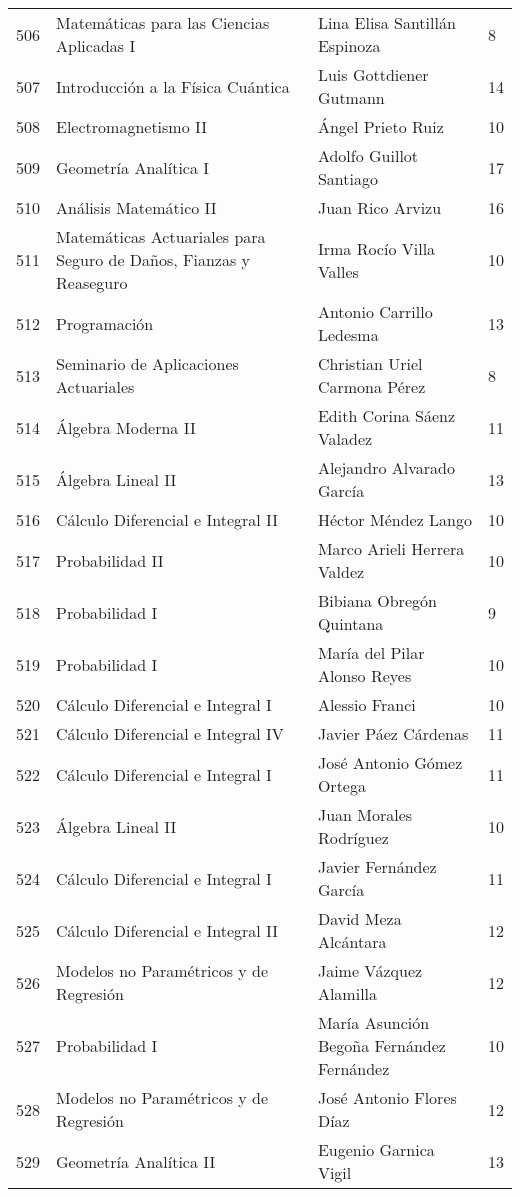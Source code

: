 \begin{table}[ht]
\begin{tabular}{rlll}
  506 & Matemáticas para las Ciencias Aplicadas I & Lina Elisa Santillán Espinoza & 8 \\ 
  507 & Introducción a la Física Cuántica & Luis Gottdiener Gutmann & 14 \\ 
  508 & Electromagnetismo II & Ángel Prieto Ruiz & 10 \\ 
  509 & Geometría Analítica I & Adolfo Guillot Santiago & 17 \\ 
  510 & Análisis Matemático II & Juan Rico Arvizu & 16 \\ 
  511 & Matemáticas Actuariales para Seguro de Daños, Fianzas y Reaseguro & Irma Rocío Villa Valles & 10 \\ 
  512 & Programación & Antonio Carrillo Ledesma & 13 \\ 
  513 & Seminario de Aplicaciones Actuariales & Christian Uriel Carmona Pérez & 8 \\ 
  514 & Álgebra Moderna II & Edith Corina Sáenz Valadez & 11 \\ 
  515 & Álgebra Lineal II & Alejandro Alvarado García & 13 \\ 
  516 & Cálculo Diferencial e Integral II & Héctor Méndez Lango & 10 \\ 
  517 & Probabilidad II & Marco Arieli Herrera Valdez & 10 \\ 
  518 & Probabilidad I & Bibiana Obregón Quintana & 9 \\ 
  519 & Probabilidad I & María del Pilar Alonso Reyes & 10 \\ 
  520 & Cálculo Diferencial e Integral I & Alessio Franci & 10 \\ 
  521 & Cálculo Diferencial e Integral IV & Javier Páez Cárdenas & 11 \\ 
  522 & Cálculo Diferencial e Integral I & José Antonio Gómez Ortega & 11 \\ 
  523 & Álgebra Lineal II & Juan Morales Rodríguez & 10 \\ 
  524 & Cálculo Diferencial e Integral I & Javier Fernández García & 11 \\ 
  525 & Cálculo Diferencial e Integral II & David Meza Alcántara & 12 \\ 
  526 & Modelos no Paramétricos y de Regresión & Jaime Vázquez Alamilla & 12 \\ 
  527 & Probabilidad I & María Asunción Begoña Fernández Fernández & 10 \\ 
  528 & Modelos no Paramétricos y de Regresión & José Antonio Flores Díaz & 12 \\ 
  529 & Geometría Analítica II & Eugenio Garnica Vigil & 13 \\ 

\end{tabular}
\end{table}
